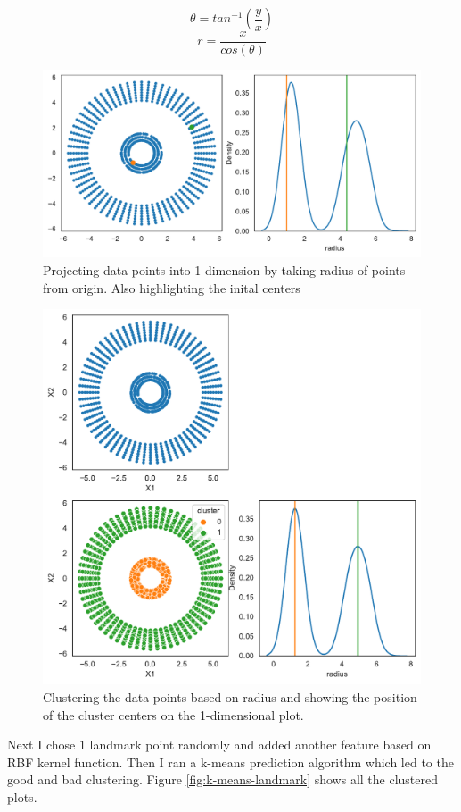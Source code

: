 \documentclass[a4paper,11pt]{article}
\begin{document}
\begin{mlsolution}
        \begin{equation}
            \label{eq:angle-calc}
            \theta = tan^{-1}\left( \frac{y}{x} \right)
        \end{equation}
        \begin{equation}
            \label{eq:radius-calc}
            r = \frac{x}{cos(\theta)}
        \end{equation}

        \begin{figure}[h]
            \centering
            \includegraphics[width=.5\textwidth]{images/k-means-with-radius-projection.pdf}
            \caption{Projecting data points into 1-dimension by taking radius of points from origin. Also highlighting the inital centers}
            \label{fig:k-means-with-radius-projection}
        \end{figure}

        \begin{figure}[h]
            \centering
            \includegraphics[width=.5\textwidth]{images/k-means-clustered-with-radius-projection.pdf}
            \caption{Clustering the data points based on radius and showing the position of the cluster centers on the 1-dimensional plot.}
            \label{fig:k-means-clustered-with-radius-projection}
        \end{figure}

        Next I chose $1$ landmark point randomly and added another feature based on RBF kernel function. Then I ran a k-means prediction algorithm which led to the good and bad clustering. Figure \ref{fig:k-means-landmark} shows all the clustered plots.


\end{mlsolution}
\end{document}
